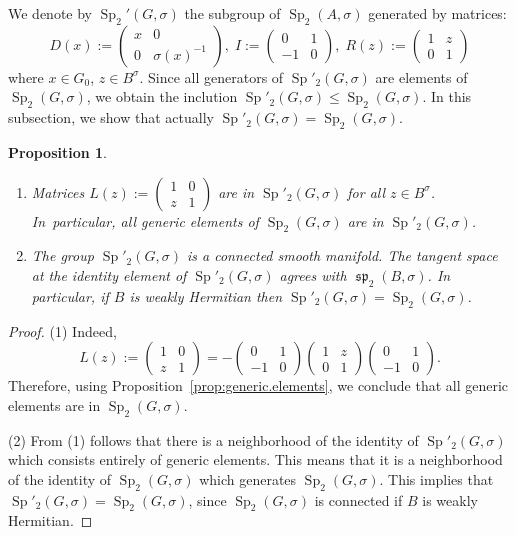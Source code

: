 \documentclass[a4paper,oneside,11pt]{amsart}
\DeclareMathOperator{\Sp}{Sp}
\DeclareMathOperator{\spp}{\mathfrak{sp}}
\theoremstyle{plain}
\newtheorem{prop}[teo]{Proposition}
\theoremstyle{definition}
\theoremstyle{remark}
\begin{document}
We denote by $\Sp_2'(G,\sigma)$ the subgroup of $\Sp_2(A,\sigma)$ generated by matrices:
$$D(x):=\begin{pmatrix}
    x & 0 \\
    0 & \sigma(x)^{-1}
    \end{pmatrix},\;
I:=\begin{pmatrix}
    0 & 1 \\
    -1 & 0
    \end{pmatrix},\;
R(z):=\begin{pmatrix}
    1 & z \\
    0 & 1
    \end{pmatrix}$$
where $x\in G_0$, $z\in B^{\sigma}$. Since all generators of $\Sp'_2(G,\sigma)$ are elements of $\Sp_2(G,\sigma)$, we obtain the inclution $\Sp'_2(G,\sigma)\leq \Sp_2(G,\sigma)$. In this subsection, we show that actually $\Sp'_2(G,\sigma)=\Sp_2(G,\sigma)$.

\begin{prop}\begin{enumerate}
    \item Matrices $L(z):=\begin{pmatrix}
    1 & 0 \\
    z & 1
    \end{pmatrix}$ are in $\Sp'_2(G,\sigma)$ for all $z\in B^{\sigma}$. In~particular, all generic elements of $\Sp_2(G,\sigma)$ are in $\Sp'_2(G,\sigma)$.
    \item The group $\Sp'_2(G,\sigma)$ is a connected smooth manifold. The tangent space at the identity element of  $\Sp'_2(G,\sigma)$ agrees with $\spp_2(B,\sigma)$. In particular, if $B$ is weakly Hermitian then $\Sp'_2(G,\sigma)=\Sp_2(G,\sigma)$.
\end{enumerate}
\end{prop}

\begin{proof} (1) Indeed,
$$L(z):=\begin{pmatrix}
    1 & 0 \\
    z & 1
    \end{pmatrix}=
    -\begin{pmatrix}
    0 & 1 \\
    -1 & 0
    \end{pmatrix}
    \begin{pmatrix}
    1 & z \\
    0 & 1
    \end{pmatrix}
    \begin{pmatrix}
    0 & 1 \\
    -1 & 0
    \end{pmatrix}.$$
Therefore, using Proposition~\ref{prop:generic.elements}, we conclude that all generic elements are in  $\Sp_2(G,\sigma)$.

(2) From (1) follows that there is a neighborhood of the identity of $\Sp'_2(G,\sigma)$ which consists entirely of generic elements. This means that it is a neighborhood of the identity of $\Sp_2(G,\sigma)$ which generates $\Sp_2(G,\sigma)$. This implies that $\Sp'_2(G,\sigma)=\Sp_2(G,\sigma)$, since $\Sp_2(G,\sigma)$ is connected if $B$ is weakly Hermitian.
\end{proof}
\end{document}
